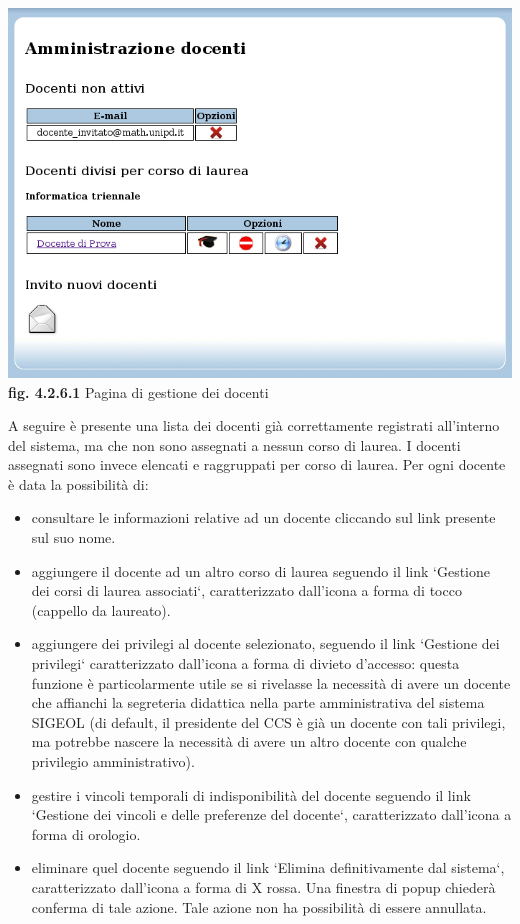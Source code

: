 \documentclass[11pt,a4paper]{article}
\begin{document}
\bigskip
\begin{center}
	\includegraphics[scale=0.5]{images/amministrazione_docenti.jpg}\\
	\textbf{fig. 4.2.6.1} Pagina di gestione dei docenti\\
\end{center}
\bigskip

A seguire è presente una lista dei docenti già correttamente registrati all'interno del sistema, ma che non sono assegnati a nessun corso di laurea.
I docenti assegnati sono invece elencati e raggruppati per corso di laurea.
Per ogni docente è data la possibilità di:
\begin{itemize}
 \item consultare le informazioni relative ad un docente cliccando sul link presente sul suo nome.
 \item aggiungere il docente ad un altro corso di laurea seguendo il link `Gestione dei corsi di laurea associati`, caratterizzato dall'icona a forma di tocco (cappello da laureato).
 \item aggiungere dei privilegi al docente selezionato, seguendo il link `Gestione dei privilegi` caratterizzato dall'icona a forma di divieto d'accesso: questa funzione è particolarmente utile se si rivelasse la necessità di avere un docente che affianchi la segreteria didattica nella parte amministrativa del sistema SIGEOL (di default, il presidente del CCS è già un docente con tali privilegi, ma potrebbe nascere la necessità di avere un altro docente con qualche privilegio amministrativo).
 \item gestire i vincoli temporali di indisponibilità del docente seguendo il link `Gestione dei vincoli e delle preferenze del docente`, caratterizzato dall'icona a forma di orologio.
 \item eliminare quel docente seguendo il link `Elimina definitivamente dal sistema`, caratterizzato dall'icona a forma di X rossa. Una finestra di popup chiederà conferma di tale azione. Tale azione non ha possibilità di essere annullata.
\end{itemize}
\end{document}

